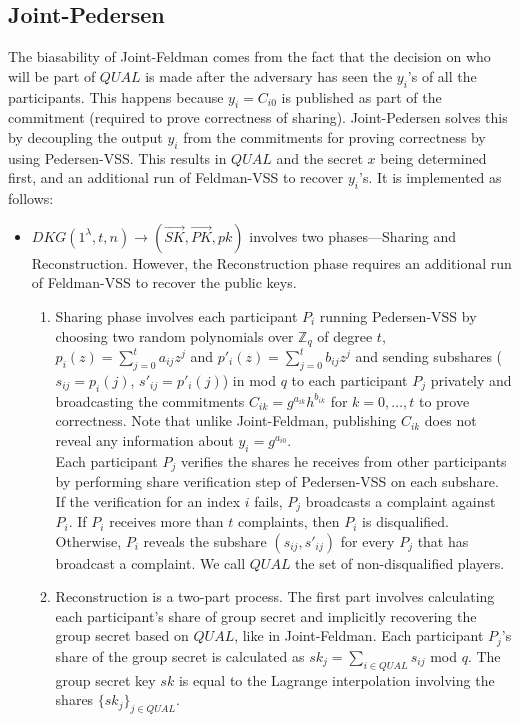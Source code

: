 \documentclass[letterpaper,twocolumn,10pt]{article}
\theoremstyle{definition}
\theoremstyle{remark}
\begin{document}
\subsection{Joint-Pedersen}
\label{appendix:jointPedersen}
The biasability of Joint-Feldman comes from the fact that the decision on who will be part of $QUAL$ is made after the adversary has seen the $y_i$'s of all the participants. This happens because $y_i = C_{i0}$ is published as part of the commitment (required to prove correctness of sharing). Joint-Pedersen solves this by decoupling the output $y_i$ from the commitments for proving correctness by using Pedersen-VSS. This results in $QUAL$ and the secret $x$ being determined first, and an additional run of Feldman-VSS to recover $y_i$'s. It is implemented as follows:
\begin{itemize}
    \item $DKG(1^{\lambda}, t, n) \rightarrow (\vec{SK}, \vec{PK}, pk)$ involves two phases---Sharing and Reconstruction. However, the Reconstruction phase requires an additional run of Feldman-VSS to recover the public keys. 
    \begin{enumerate}
    \item Sharing phase involves each participant $P_i$ running Pedersen-VSS by choosing two random polynomials over $\mathbb{Z}_q$ of degree $t$, $p_i(z) = \sum_{j = 0}^{t} a_{ij} z^j$ and $p'_i(z) = \sum_{j = 0}^{t} b_{ij} z^j$ and sending subshares ($s_{ij} = p_i(j)$, $s'_{ij} = p'_i(j)$) in mod $q$ to each participant $P_j$ privately and broadcasting the commitments $C_{ik} = g^{a_{ik}} h^{b_{ik}}$ for $k = 0, \ldots, t$ to prove correctness. Note that unlike Joint-Feldman, publishing $C_{ik}$ does not reveal any information about $y_i = g^{a_{i0}}$.\\
    Each participant $P_j$ verifies the shares he receives from other participants by performing share verification step of Pedersen-VSS on each subshare. If the verification for an index $i$ fails, $P_j$ broadcasts a complaint against $P_i$.
    If $P_i$ receives more than $t$ complaints, then $P_i$ is disqualified. Otherwise, $P_i$ reveals the subshare $(s_{ij}, s'_{ij})$ for every $P_j$ that has broadcast a complaint. We call $QUAL$ the set of non-disqualified players.
    
    \item Reconstruction is a two-part process. The first part involves calculating each participant's share of group secret and implicitly recovering the group secret based on $QUAL$, like in Joint-Feldman. Each participant $P_j$'s share of the group secret is calculated as $sk_j = \sum_{i \in QUAL} s_{ij}$ mod $q$.  The group secret key $sk$ is equal to the Lagrange interpolation involving the shares $\{sk_j\}_{j \in QUAL}$. 
    

\end{enumerate}
\end{itemize}
\end{document}
